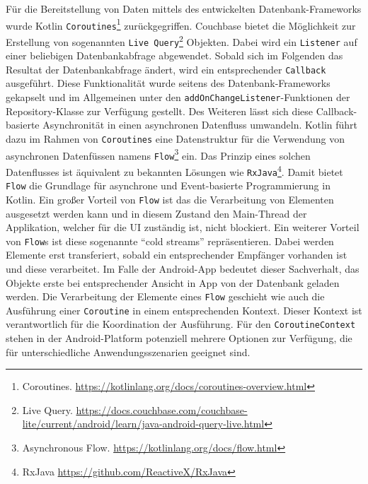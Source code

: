 Für die Bereitstellung von Daten mittels des entwickelten Datenbank-Frameworks wurde Kotlin \texttt{Coroutines}\footnote{Coroutines. \url{https://kotlinlang.org/docs/coroutines-overview.html}} zurückgegriffen. Couchbase bietet die Möglichkeit zur Erstellung von sogenannten \texttt{Live Query}\footnote{Live Query. \newline \url{https://docs.couchbase.com/couchbase-lite/current/android/learn/java-android-query-live.html}} Objekten. Dabei wird ein \texttt{Listener} auf einer beliebigen Datenbankabfrage abgewendet. Sobald sich im Folgenden das Resultat der Datenbankabfrage ändert, wird ein entsprechender \texttt{Callback} ausgeführt. Diese Funktionalität wurde seitens des Datenbank-Frameworks gekapselt und im Allgemeinen unter den \texttt{addOnChangeListener}-Funktionen der Repository-Klasse zur Verfügung gestellt. Des Weiteren lässt sich diese Callback-basierte Asynchronität in einen asynchronen Datenfluss umwandeln. Kotlin führt dazu im Rahmen von \texttt{Coroutines} eine Datenstruktur für die Verwendung von asynchronen Datenfüssen namens \texttt{Flow}\footnote{Asynchronous Flow. \url{https://kotlinlang.org/docs/flow.html}} ein. Das Prinzip eines solchen Datenflusses ist äquivalent zu bekannten Lösungen wie \texttt{RxJava}\footnote{RxJava \url{https://github.com/ReactiveX/RxJava}}. Damit bietet \texttt{Flow} die Grundlage für asynchrone und Event-basierte Programmierung in Kotlin. Ein großer Vorteil von \texttt{Flow} ist das die Verarbeitung von Elementen ausgesetzt werden kann und in diesem Zustand den Main-Thread der Applikation, welcher für die UI zuständig ist, nicht blockiert. Ein weiterer Vorteil von \texttt{Flow}s ist diese sogenannte \enquote{cold streams} repräsentieren. Dabei werden Elemente erst transferiert, sobald ein entsprechender Empfänger vorhanden ist und diese verarbeitet. Im Falle der Android-App bedeutet dieser Sachverhalt, das Objekte erste bei entsprechender Ansicht in App von der Datenbank geladen werden. Die Verarbeitung der Elemente eines \texttt{Flow} geschieht wie auch die Ausführung einer \texttt{Coroutine} in einem entsprechenden Kontext. Dieser Kontext ist verantwortlich für die Koordination der Ausführung. Für den \texttt{CoroutineContext} stehen in der Android-Platform potenziell mehrere Optionen zur Verfügung, die für unterschiedliche Anwendungsszenarien geeignet sind. 

